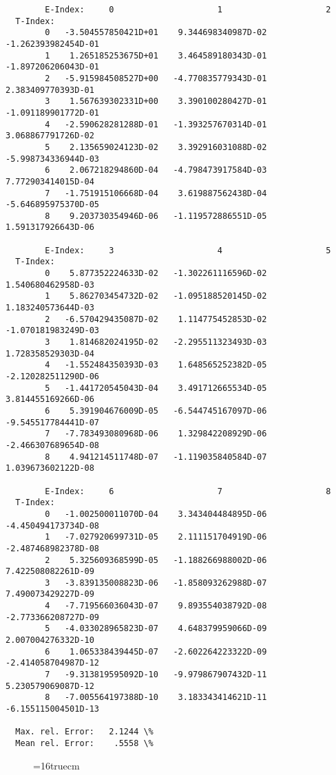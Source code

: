 \documentclass[12pt,dvipdfmx]{article}
\begin{document}
\begin{small}\begin{verbatim}
        E-Index:     0                     1                     2
  T-Index:
        0   -3.504557850421D+01    9.344698340987D-02   -1.262393982454D-01
        1    1.265185253675D+01    3.464589180343D-01   -1.897206206043D-01
        2   -5.915984508527D+00   -4.770835779343D-01    2.383409770393D-01
        3    1.567639302331D+00    3.390100280427D-01   -1.091189901772D-01
        4   -2.590628281288D-01   -1.393257670314D-01    3.068867791726D-02
        5    2.135659024123D-02    3.392916031088D-02   -5.998734336944D-03
        6    2.067218294860D-04   -4.798473917584D-03    7.772903414015D-04
        7   -1.751915106668D-04    3.619887562438D-04   -5.646895975370D-05
        8    9.203730354946D-06   -1.119572886551D-05    1.591317926643D-06

        E-Index:     3                     4                     5
  T-Index:
        0    5.877352224633D-02   -1.302261116596D-02    1.540680462958D-03
        1    5.862703454732D-02   -1.095188520145D-02    1.183240573644D-03
        2   -6.570429435087D-02    1.114775452853D-02   -1.070181983249D-03
        3    1.814682024195D-02   -2.295511323493D-03    1.728358529303D-04
        4   -1.552484350393D-03    1.648565252382D-05   -2.120282511290D-06
        5   -1.441720545043D-04    3.491712665534D-05    3.814455169266D-06
        6    5.391904676009D-05   -6.544745167097D-06   -9.545517784441D-07
        7   -7.783493080968D-06    1.329842208929D-06   -2.466307689654D-08
        8    4.941214511748D-07   -1.119035840584D-07    1.039673602122D-08

        E-Index:     6                     7                     8
  T-Index:
        0   -1.002500011070D-04    3.343404484895D-06   -4.450494173734D-08
        1   -7.027920699731D-05    2.111151704919D-06   -2.487468982378D-08
        2    5.325609368599D-05   -1.188266988002D-06    7.422508082261D-09
        3   -3.839135008823D-06   -1.858093262988D-07    7.490073429227D-09
        4   -7.719566036043D-07    9.893554038792D-08   -2.773366208727D-09
        5   -4.033028965823D-07    4.648379959066D-09    2.007004276332D-10
        6    1.065338439445D-07   -2.602264223322D-09   -2.414058704987D-12
        7   -9.313819595092D-10   -9.979867907432D-11    5.230579069087D-12
        8   -7.005564197388D-10    3.183343414621D-11   -6.155115004501D-13

  Max. rel. Error:   2.1244 \%
  Mean rel. Error:    .5558 \%

\end{verbatim}\end{small}
\begin{figure} \label{2.2.5fl}
\epsfxsize=16truecm
\end{figure}
\newpage
\end{document}
